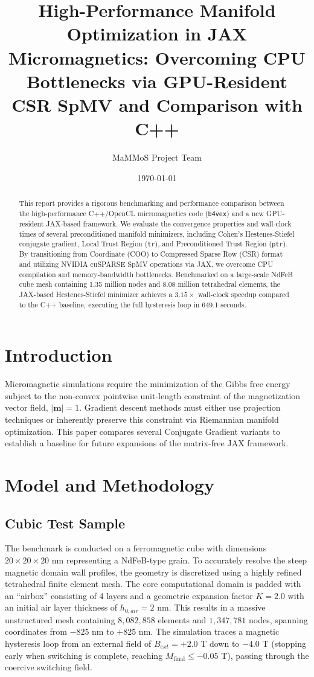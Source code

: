 \documentclass[11pt,a4paper]{article}
\title{High-Performance Manifold Optimization in JAX Micromagnetics: Overcoming CPU Bottlenecks via GPU-Resident CSR SpMV and Comparison with C++}
\author{MaMMoS Project Team}
\date{\today}
\begin{document}
\maketitle

\begin{abstract}
This report provides a rigorous benchmarking and performance comparison between the high-performance C++/OpenCL micromagnetics code (\texttt{b4vex}) and a new GPU-resident JAX-based framework. We evaluate the convergence properties and wall-clock times of several preconditioned manifold minimizers, including Cohen's Hestenes-Stiefel conjugate gradient, Local Trust Region (\texttt{tr}), and Preconditioned Trust Region (\texttt{ptr}). By transitioning from Coordinate (COO) to Compressed Sparse Row (CSR) format and utilizing NVIDIA cuSPARSE SpMV operations via JAX, we overcome CPU compilation and memory-bandwidth bottlenecks. Benchmarked on a large-scale NdFeB cube mesh containing 1.35 million nodes and 8.08 million tetrahedral elements, the JAX-based Hestenes-Stiefel minimizer achieves a $3.15\times$ wall-clock speedup compared to the C++ baseline, executing the full hysteresis loop in 649.1 seconds.
\end{abstract}

\section{Introduction}
Micromagnetic simulations require the minimization of the Gibbs free energy subject to the non-convex pointwise unit-length constraint of the magnetization vector field, $|\mathbf{m}| = 1$. Gradient descent methods must either use projection techniques or inherently preserve this constraint via Riemannian manifold optimization. This paper compares several Conjugate Gradient variants to establish a baseline for future expansions of the matrix-free JAX framework.

\section{Model and Methodology}

\subsection{Cubic Test Sample}
The benchmark is conducted on a ferromagnetic cube with dimensions $20 \times 20 \times 20$ nm representing a NdFeB-type grain. To accurately resolve the steep magnetic domain wall profiles, the geometry is discretized using a highly refined tetrahedral finite element mesh. The core computational domain is padded with an ``airbox'' consisting of 4 layers and a geometric expansion factor $K = 2.0$ with an initial air layer thickness of $h_{0,air} = 2$ nm. This results in a massive unstructured mesh containing $8,082,858$ elements and $1,347,781$ nodes, spanning coordinates from $-825$ nm to $+825$ nm. The simulation traces a magnetic hysteresis loop from an external field of $B_{ext} = +2.0$ T down to $-4.0$ T (stopping early when switching is complete, reaching $M_{\text{final}} \le -0.05$ T), passing through the coercive switching field.
\end{document}
